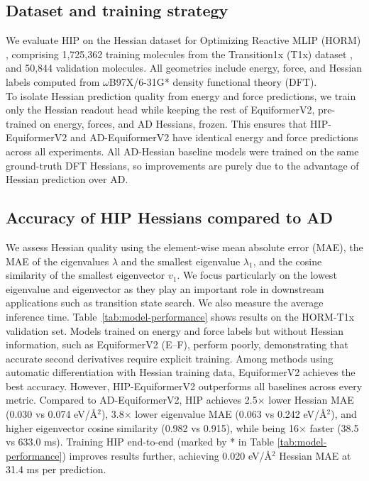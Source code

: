 \documentclass[pdflatex,sn-mathphys-num]{sn-jnl}%
\theoremstyle{thmstyleone}%
\theoremstyle{thmstyletwo}%
\theoremstyle{thmstylethree}%
\begin{document}
\subsection{Dataset and training strategy}
We evaluate HIP on the Hessian dataset for Optimizing Reactive MLIP (HORM) \cite{cui2025horm}, comprising 1,725,362 training molecules from the Transition1x (T1x) dataset \cite{schreiner2022transition1x}, and 50,844 validation molecules. All geometries include energy, force, and Hessian labels computed from $\omega$B97X/6-31G* density functional theory (DFT).\\
To isolate Hessian prediction quality from energy and force predictions, we train only the Hessian readout head while keeping the rest of EquiformerV2, pre-trained on energy, forces, and AD Hessians, frozen. This ensures that HIP-EquiformerV2 and AD-EquiformerV2 have identical energy and force predictions across all experiments. All AD-Hessian baseline models were trained on the same ground-truth DFT Hessians, so improvements are purely due to the advantage of Hessian prediction over AD.

\subsection{Accuracy of HIP Hessians compared to AD}
We assess Hessian quality using the element-wise mean absolute error (MAE), the MAE of the eigenvalues $\lambda$ and the smallest eigenvalue $\lambda_1$, and the cosine similarity of the smallest eigenvector $v_1$. We focus particularly on the lowest eigenvalue and eigenvector as they play an important role in downstream applications such as transition state search. We also measure the average inference time. Table~\ref{tab:model-performance} shows results on the HORM-T1x validation set.
Models trained on energy and force labels but without Hessian information, such as EquiformerV2 (E–F), perform poorly, demonstrating that accurate second derivatives require explicit training. Among methods using automatic differentiation with Hessian training data, EquiformerV2 achieves the best accuracy. However, HIP-EquiformerV2 outperforms all baselines across every metric. Compared to AD-EquiformerV2, HIP achieves 2.5$\times$ lower Hessian MAE (0.030 vs 0.074 eV/\AA$^2$), 3.8$\times$ lower eigenvalue MAE (0.063 vs 0.242 eV/\AA$^2$), and higher eigenvector cosine similarity (0.982 vs 0.915), while being 16$\times$ faster (38.5 vs 633.0 ms). Training HIP end-to-end (marked by * in Table \ref{tab:model-performance}) improves results further, achieving 0.020 eV/\AA$^2$ Hessian MAE at 31.4 ms per prediction.
\end{document}
